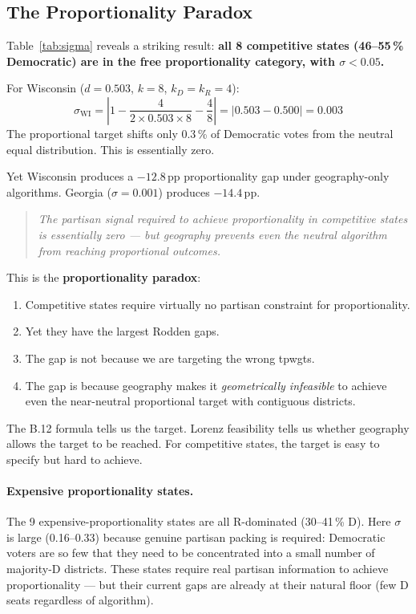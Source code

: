 \subsection{The Proportionality Paradox}
\label{sec:paradox}

Table~\ref{tab:sigma} reveals a striking result:
\textbf{all 8 competitive states (46--55\,\% Democratic) are in the free
proportionality category, with $\sigma < 0.05$.}

For Wisconsin ($d = 0.503$, $k=8$, $k_D = k_R = 4$):
\[
  \sigma_{\text{WI}} = \left|1 - \frac{4}{2 \times 0.503 \times 8} - \frac{4}{8}\right|
  = |0.503 - 0.500| = 0.003
\]
The proportional target shifts only 0.3\,\% of Democratic votes from the neutral
equal distribution. This is essentially zero.

Yet Wisconsin produces a $-12.8$\,pp proportionality gap under geography-only
algorithms. Georgia ($\sigma = 0.001$) produces $-14.4$\,pp.

\begin{quote}
\emph{The partisan signal required to achieve proportionality in competitive states is essentially zero --- but geography prevents even the neutral algorithm from reaching proportional outcomes.}
\end{quote}

This is the \textbf{proportionality paradox}:
\begin{enumerate}
\item Competitive states require virtually no partisan constraint for proportionality.
\item Yet they have the largest Rodden gaps.
\item The gap is not because we are targeting the wrong tpwgts.
\item The gap is because geography makes it \emph{geometrically infeasible} to achieve
  even the near-neutral proportional target with contiguous districts.
\end{enumerate}

The B.12 formula tells us the target.
Lorenz feasibility tells us whether geography allows the target to be reached.
For competitive states, the target is easy to specify but hard to achieve.

\paragraph{Expensive proportionality states.}
The 9 expensive-proportionality states are all R-dominated (30--41\,\% D).
Here $\sigma$ is large (0.16--0.33) because genuine partisan packing is
required: Democratic voters are so few that they need to be concentrated
into a small number of majority-D districts.
These states require real partisan information to achieve proportionality ---
but their current gaps are already at their natural floor (few D seats
regardless of algorithm).

